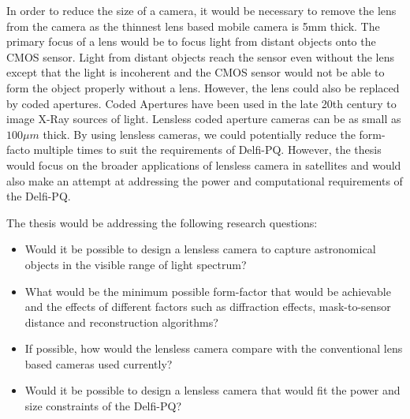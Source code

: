 In order to reduce the size of a camera, it would be necessary to remove the lens from the camera as the thinnest lens based mobile camera is 5mm thick. The primary focus of a lens would be to focus light from distant objects onto the CMOS sensor. Light from distant objects reach the sensor even without the lens except that the light is incoherent and the CMOS sensor would not be able to form the object properly without a lens. However, the lens could also be replaced by coded apertures. Coded Apertures have been used in the late 20th century to image X-Ray sources of light. Lensless coded aperture cameras can be as small as $100 \mu m$ thick. By using lensless cameras, we could potentially reduce the form-facto multiple times to suit the requirements of Delfi-PQ. However, the thesis would focus on the broader applications of lensless camera in satellites and would also make an attempt at addressing the power and computational requirements of the Delfi-PQ.

The thesis would be addressing the following research questions:
\begin{itemize}
\item Would it be possible to design a lensless camera to capture astronomical objects in the visible range of light spectrum?
\item What would be the minimum possible form-factor that would be achievable and the effects of different factors such as diffraction effects, mask-to-sensor distance and reconstruction algorithms?
\item If possible, how would the lensless camera compare with the conventional lens based cameras used currently?
\item Would it be possible to design a lensless camera that would fit the power and size constraints of the Delfi-PQ?
\end{itemize}
\vspace{1\baselineskip}

\noindent


